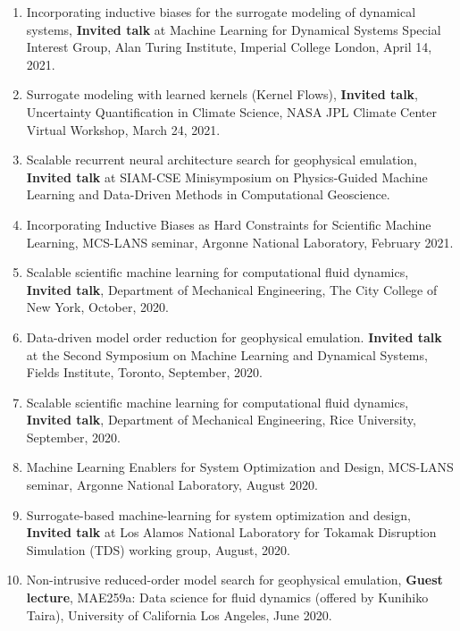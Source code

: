 \documentclass[letterpaper]{article}
\begin{document}
\begin{enumerate}
\item Incorporating inductive biases for the surrogate modeling of dynamical systems, \textbf{Invited talk} at Machine Learning for Dynamical Systems Special Interest Group, Alan Turing Institute, Imperial College London, April 14, 2021.

\item Surrogate modeling with learned kernels (Kernel Flows), \textbf{Invited talk}, Uncertainty Quantification in Climate Science, NASA JPL Climate Center Virtual Workshop, March 24, 2021.

\item Scalable recurrent neural architecture search for geophysical emulation, \textbf{Invited talk} at SIAM-CSE Minisymposium on Physics-Guided Machine Learning and Data-Driven Methods in Computational Geoscience.

\item Incorporating Inductive Biases as Hard Constraints for Scientific Machine Learning, MCS-LANS seminar, Argonne National Laboratory, February 2021.

\item Scalable scientific machine learning for computational fluid dynamics, \textbf{Invited talk}, Department of Mechanical Engineering, The City College of New York, October, 2020.

\item Data-driven model order reduction for geophysical emulation. \textbf{Invited talk} at the Second Symposium on Machine Learning and Dynamical Systems, Fields Institute, Toronto, September, 2020.

\item Scalable scientific machine learning for computational fluid dynamics, \textbf{Invited talk}, Department of Mechanical Engineering, Rice University, September, 2020.

\item Machine Learning Enablers for System Optimization and Design, MCS-LANS seminar, Argonne National Laboratory, August 2020.

\item Surrogate-based machine-learning for system optimization and design, \textbf{Invited talk} at Los Alamos National Laboratory for Tokamak Disruption Simulation (TDS) working group, August, 2020.

\item Non-intrusive reduced-order model search for geophysical emulation, \textbf{Guest lecture}, MAE259a: Data science for fluid dynamics (offered by Kunihiko Taira), University of California Los Angeles, June 2020.


\end{enumerate}
\end{document}
